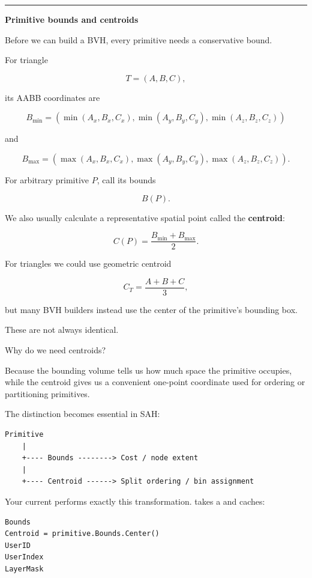 \begin{center}\rule{0.5\linewidth}{0.5pt}\end{center}

\textbf{Primitive bounds and centroids}

Before we can build a BVH, every primitive needs a conservative bound.

For triangle

\[
T=(A,B,C),
\]

its AABB coordinates are

\[
B_{\min}=
\left(
\min(A_x,B_x,C_x),
\min(A_y,B_y,C_y),
\min(A_z,B_z,C_z)
\right)
\]

and

\[
B_{\max}=
\left(
\max(A_x,B_x,C_x),
\max(A_y,B_y,C_y),
\max(A_z,B_z,C_z)
\right).
\]

For arbitrary primitive \(P\), call its bounds

\[
B(P).
\]

We also usually calculate a representative spatial point called the \textbf{centroid}:

\[
C(P)=\frac{B_{\min}+B_{\max}}{2}.
\]

For triangles we could use geometric centroid

\[
C_T=\frac{A+B+C}{3},
\]

but many BVH builders instead use the center of the primitive's bounding box.

These are not always identical.

Why do we need centroids?

Because the bounding volume tells us how much space the primitive occupies, while the centroid gives us a convenient one-point coordinate used for ordering or partitioning primitives.

The distinction becomes essential in SAH:

\begin{verbatim}
Primitive
    |
    +---- Bounds --------> Cost / node extent
    |
    +---- Centroid ------> Split ordering / bin assignment
\end{verbatim}

Your current  performs exactly this transformation.  takes a  and caches:

\begin{verbatim}
Bounds
Centroid = primitive.Bounds.Center()
UserID
UserIndex
LayerMask
\end{verbatim}

